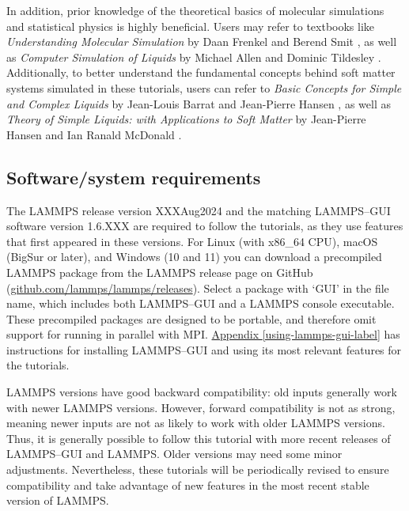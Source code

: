 \documentclass[9pt,tutorial]{livecoms}
\begin{document}
In addition, prior knowledge of the theoretical basics of molecular
simulations and statistical physics is highly beneficial.  Users may
refer to textbooks like \textit{Understanding Molecular Simulation} by
Daan Frenkel and Berend Smit \cite{frenkel2023understanding}, as well as
\textit{Computer Simulation of Liquids} by Michael Allen and Dominic
Tildesley \cite{allen2017computer}.  Additionally, to better understand
the fundamental concepts behind soft matter systems simulated in these
tutorials, users can refer to \textit{Basic Concepts for Simple and
  Complex Liquids} by Jean-Louis Barrat and Jean-Pierre Hansen
\cite{barrat2003basic}, as well as \textit{Theory of Simple Liquids:
  with Applications to Soft Matter} by Jean-Pierre Hansen and Ian Ranald
McDonald \cite{hansen2013theory}.

\subsection{Software/system requirements}

The LAMMPS release version XXXAug2024 \cite{lammps_code} and the
matching LAMMPS--GUI software version 1.6.XXX are required to follow the
tutorials, as they use features that first appeared in these versions.
For Linux (with x86\_64 CPU), macOS (BigSur or later), and Windows (10
and 11) you can download a precompiled LAMMPS package from the LAMMPS
release page on GitHub
(\href{https://github.com/lammps/lammps/releases}{github.com/lammps/lammps/releases}).
Select a package with `GUI' in the file name, which includes
both LAMMPS--GUI and a LAMMPS console executable.  These
precompiled packages are designed to be portable, and therefore omit support for
running in parallel with MPI.  \hyperref[using-lammps-gui-label]{Appendix
  \ref{using-lammps-gui-label}} has instructions for installing
LAMMPS--GUI and using its most relevant features for the tutorials.

LAMMPS versions have good backward compatibility: old inputs generally work with
newer LAMMPS versions.  However, forward compatibility is not as strong, meaning
newer inputs are not as likely to work with older LAMMPS versions.  Thus, it is
generally possible to follow this tutorial with more recent releases of
LAMMPS--GUI and LAMMPS.  Older versions may need some minor adjustments.
Nevertheless, these tutorials will be periodically revised to ensure compatibility
and take advantage of new features in the most recent stable version of LAMMPS.
\end{document}
